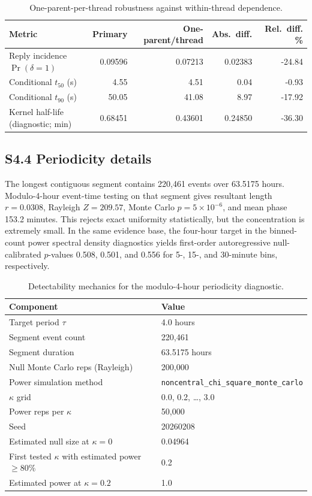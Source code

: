 \begin{table}[h]
\centering
\caption{One-parent-per-thread robustness against within-thread dependence.}
\label{tab:supp-dependence-robustness}
\small
\begin{tabular}{@{}lrrrr@{}}
\toprule
\textbf{Metric} & \textbf{Primary} & \textbf{One-parent/thread} & \textbf{Abs.\ diff.} & \textbf{Rel.\ diff. \%} \\
\midrule
Reply incidence \(\Pr(\delta=1)\) & 0.09596 & 0.07213 & 0.02383 & -24.84 \\
Conditional \(t_{50}\) (s) & 4.55 & 4.51 & 0.04 & -0.93 \\
Conditional \(t_{90}\) (s) & 50.05 & 41.08 & 8.97 & -17.92 \\
Kernel half-life (diagnostic; min) & 0.68451 & 0.43601 & 0.24850 & -36.30 \\
\bottomrule
\end{tabular}
\end{table}

\subsection*{S4.4 Periodicity details}

The longest contiguous segment contains 220,461 events over 63.5175 hours.
Modulo-4-hour event-time testing on that segment gives resultant length
\(r=0.0308\), Rayleigh \(Z=209.57\), Monte Carlo
\(p=5\times 10^{-6}\), and mean phase 153.2 minutes. This rejects exact
uniformity statistically, but the concentration is extremely small. In the same
evidence base, the four-hour target in the binned-count power spectral density
diagnostics yields first-order autoregressive null-calibrated \(p\)-values
0.508, 0.501, and 0.556 for 5-, 15-, and 30-minute bins, respectively.

\begin{table}[h]
\centering
\caption{Detectability mechanics for the modulo-4-hour periodicity diagnostic.}
\label{tab:supp-periodicity-detectability}
\small
\begin{tabular}{@{}ll@{}}
\toprule
\textbf{Component} & \textbf{Value} \\
\midrule
Target period \(\tau\) & 4.0 hours \\
Segment event count & 220,461 \\
Segment duration & 63.5175 hours \\
Null Monte Carlo reps (Rayleigh) & 200,000 \\
Power simulation method & \texttt{noncentral\_chi\_square\_monte\_carlo} \\
\(\kappa\) grid & 0.0, 0.2, \ldots, 3.0 \\
Power reps per \(\kappa\) & 50,000 \\
Seed & 20260208 \\
Estimated null size at \(\kappa=0\) & 0.04964 \\
First tested \(\kappa\) with estimated power \(\ge 80\%\) & 0.2 \\
Estimated power at \(\kappa=0.2\) & 1.0 \\
\bottomrule
\end{tabular}
\end{table}

